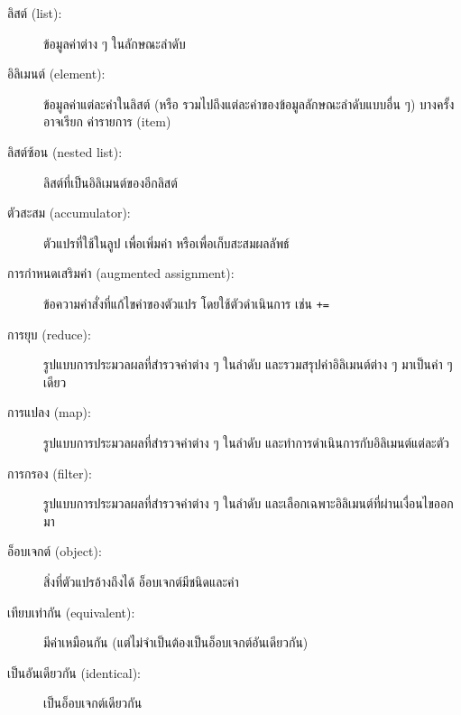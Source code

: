 \begin{description}

\item[ลิสต์ (list):] ข้อมูลค่าต่าง ๆ ในลักษณะลำดับ

\item[อิลิเมนต์ (element):] ข้อมูลค่าแต่ละค่าในลิสต์ (หรือ รวมไปถึงแต่ละค่าของข้อมูลลักษณะลำดับแบบอื่น ๆ) บางครั้งอาจเรียก ค่ารายการ (item)

\item[ลิสต์ซ้อน (nested list):] ลิสต์ที่เป็นอิลิเมนต์ของอีกลิสต์

\item[ตัวสะสม (accumulator):] ตัวแปรที่ใช้ในลูป เพื่อเพิ่มค่า หรือเพื่อเก็บสะสมผลลัพธ์

\item[การกำหนดเสริมค่า (augmented assignment):] ข้อความคำสั่งที่แก้ไขค่าของตัวแปร โดยใช้ตัวดำเนินการ เช่น \verb|+=|


\item[การยุบ (reduce):] รูปแบบการประมวลผลที่สำรวจค่าต่าง ๆ ในลำดับ และรวมสรุปค่าอิลิเมนต์ต่าง ๆ มาเป็นค่า ๆ เดียว


\item[การแปลง (map):] รูปแบบการประมวลผลที่สำรวจค่าต่าง ๆ ในลำดับ และทำการดำเนินการกับอิลิเมนต์แต่ละตัว

\item[การกรอง (filter):] รูปแบบการประมวลผลที่สำรวจค่าต่าง ๆ ในลำดับ และเลือกเฉพาะอิลิเมนต์ที่ผ่านเงื่อนไขออกมา


\item[อ็อบเจกต์ (object):] สิ่งที่ตัวแปรอ้างถึงได้ 
อ็อบเจกต์มีชนิดและค่า


\item[เทียบเท่ากัน (equivalent):] มีค่าเหมือนกัน (แต่ไม่จำเป็นต้องเป็นอ็อบเจกต์อันเดียวกัน)

\item[เป็นอันเดียวกัน (identical):] เป็นอ็อบเจกต์เดียวกัน


\end{description}
